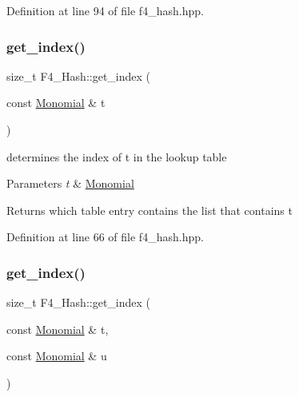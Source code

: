 Definition at line 94 of file f4\+\_\+hash.\+hpp.

\mbox{\label{class_f4___hash_a7b22f6999f276e58087fe668a01f240a}} 
\subsubsection{\texorpdfstring{get\+\_\+index()}{get\_index()}\hspace{0.1cm}{\footnotesize\ttfamily [1/2]}}
{\footnotesize\ttfamily size\+\_\+t F4\+\_\+\+Hash\+::get\+\_\+index (\begin{DoxyParamCaption}\item[{const \hyperlink{group__polygroup_class_monomial}{Monomial} \&}]{t }\end{DoxyParamCaption})\hspace{0.3cm}{\ttfamily [inline]}}



determines the index of {\ttfamily t} in the lookup table 


\begin{DoxyParams}{Parameters}
{\em t} & {\ttfamily \hyperlink{group__polygroup_class_monomial}{Monomial}} \\
\hline
\end{DoxyParams}
\begin{DoxyReturn}{Returns}
which table entry contains the list that contains {\ttfamily t} 
\end{DoxyReturn}


Definition at line 66 of file f4\+\_\+hash.\+hpp.

\mbox{\label{class_f4___hash_a12cff698cefa0375ab76ee6c36a0ce6c}} 
\subsubsection{\texorpdfstring{get\+\_\+index()}{get\_index()}\hspace{0.1cm}{\footnotesize\ttfamily [2/2]}}
{\footnotesize\ttfamily size\+\_\+t F4\+\_\+\+Hash\+::get\+\_\+index (\begin{DoxyParamCaption}\item[{const \hyperlink{group__polygroup_class_monomial}{Monomial} \&}]{t,  }\item[{const \hyperlink{group__polygroup_class_monomial}{Monomial} \&}]{u }\end{DoxyParamCaption})\hspace{0.3cm}{\ttfamily [inline]}}




